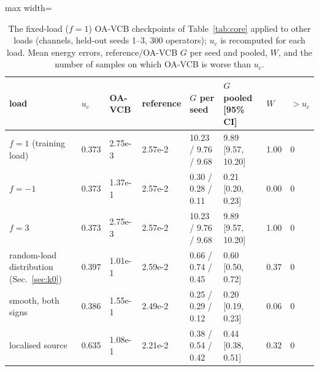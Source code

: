 \begin{table}[tbp]\centering\footnotesize\setlength{\tabcolsep}{4pt}
\caption{The fixed-load ($f=1$) OA-VCB checkpoints of Table~\ref{tab:core} applied to other loads (channels, held-out seeds 1--3, 300 operators); $u_c$ is recomputed for each load. Mean energy errors, reference/OA-VCB $G$ per seed and pooled, $W$, and the number of samples on which OA-VCB is worse than $u_c$.}\label{tab:rhs}
\begin{adjustbox}{max width=\linewidth}
\begin{tabular}{llllllll}\toprule
load & $u_c$ & OA-VCB & reference & $G$ per seed & $G$ pooled [95\% CI] & $W$ & $>u_c$ \\\midrule
$f=1$ (training load) & 0.373 & 2.75e-3 & 2.57e-2 & 10.23 / 9.76 / 9.68 & 9.89 [9.57, 10.20] & 1.00 & 0 \\
$f=-1$ & 0.373 & 1.37e-1 & 2.57e-2 & 0.30 / 0.28 / 0.11 & 0.21 [0.20, 0.23] & 0.00 & 0 \\
$f=3$ & 0.373 & 2.75e-3 & 2.57e-2 & 10.23 / 9.76 / 9.68 & 9.89 [9.57, 10.20] & 1.00 & 0 \\
random-load distribution (Sec.~\ref{sec:k0}) & 0.397 & 1.01e-1 & 2.59e-2 & 0.66 / 0.74 / 0.45 & 0.60 [0.50, 0.72] & 0.37 & 0 \\
smooth, both signs & 0.386 & 1.55e-1 & 2.49e-2 & 0.25 / 0.29 / 0.12 & 0.20 [0.19, 0.23] & 0.06 & 0 \\
localised source & 0.635 & 1.08e-1 & 2.21e-2 & 0.38 / 0.54 / 0.42 & 0.44 [0.38, 0.51] & 0.32 & 0 \\
\bottomrule\end{tabular}
\end{adjustbox}
\end{table}
